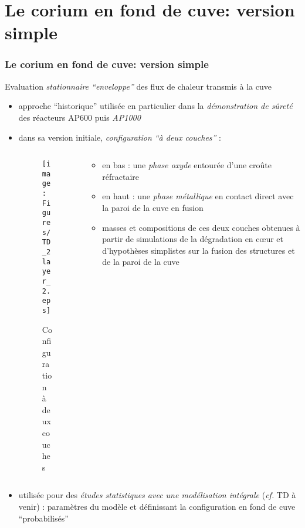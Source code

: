 \section{Le corium en fond de cuve: version simple}
\begin{frame}[fragile]
\frametitle{Le corium en fond de cuve: version simple}
Evaluation \emph{stationnaire ``enveloppe''} des flux de chaleur transmis à la cuve
\begin{itemize}
\item approche ``historique'' utilisée en particulier dans la \emph{démonstration de sûreté} des réacteurs AP600 puis \emph{AP1000} \cite{Esmaili2004} 
\item dans sa version initiale, \emph{configuration ``à deux couches''} :
\begin{columns}[T]
    \begin{column}{0.35\textwidth}
      \begin{figure}[H]
\centering \texttt{[image: Figures/TD\_2layer\_2.eps]}
\caption{Configuration à deux couches}
      \end{figure}
    \end{column}
    \begin{column}{0.65\textwidth}
    \begin{itemize}
    \item en bas : une \emph{phase oxyde} entourée d'une croûte réfractaire 
    \item en haut : une \emph{phase métallique} en contact direct avec la paroi de la cuve en fusion
    \item masses et compositions de ces deux couches obtenues à partir de simulations de la dégradation en c\oe ur et d'hypothèses simplistes sur la fusion des structures et de la paroi de la cuve
    \end{itemize}
    \end{column}
\end{columns}
  \item utilisée pour des \emph{études statistiques avec une modélisation intégrale} (\textit{cf.} TD à venir) : paramètres du modèle et définissant la configuration en fond de cuve ``probabilisés'' 
\end{itemize}

\end{frame}
